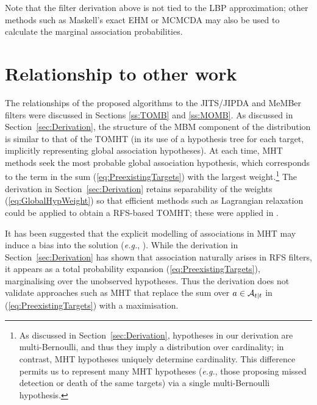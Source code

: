 \documentclass[journal,twoside]{IEEEtran}
\theoremstyle{plain}
\begin{document}
Note that the filter derivation above is not tied to the LBP approximation; other methods such as Maskell's exact EHM \cite{HorMas06} or MCMCDA \cite{OhRus09} may also be used to calculate the marginal association probabilities.

\section{Relationship to other work}
\label{sec:Relationship}
%
The relationships of the proposed algorithms to the JITS/JIPDA and MeMBer filters were discussed in Sections \ref{ss:TOMB} and \ref{ss:MOMB}. As discussed in Section~\ref{sec:Derivation}, the structure of the MBM component of the distribution is similar to that of the TOMHT (in its use of a hypothesis tree for each target, implicitly representing global association hypotheses). At each time, MHT methods seek the most probable global association hypothesis, which corresponds to the term in the sum (\ref{eq:PreexistingTargets}) with the largest weight.\footnote{As discussed in Section~\ref{sec:Derivation}, hypotheses in our derivation are multi-Bernoulli, and thus they imply a distribution over cardinality; in contrast, MHT hypotheses uniquely determine cardinality. This difference permits us to represent many MHT hypotheses (\textit{e.g.}\xspace, those proposing missed detection or death of the same targets) via a single multi-Bernoulli hypothesis.} The derivation in Section~\ref{sec:Derivation} retains separability of the weights (\ref{eq:GlobalHypWeight}) so that efficient methods such as Lagrangian relaxation could be applied to obtain a RFS-based TOMHT; these were applied in \cite{Wil11b,LauWil11}. 

It has been suggested that the explicit modelling of associations in MHT may induce a bias into the solution (\textit{e.g.}\xspace, \cite[p340]{Mah07}). While the derivation in Section~\ref{sec:Derivation} has shown that association naturally arises in RFS filters, it appears as a total probability expansion (\ref{eq:PreexistingTargets}), marginalising over the unobserved hypotheses. Thus the derivation does not validate approaches such as MHT that replace the sum over $a\in{\cal A}_{t|t}$ in (\ref{eq:PreexistingTargets}) with a maximisation.
\end{document}
